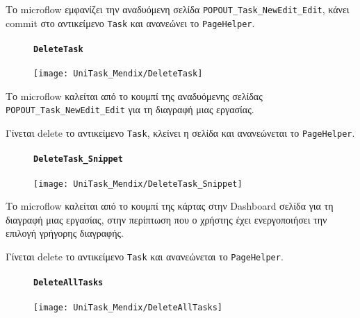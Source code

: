                 Το microflow εμφανίζει την αναδυόμενη σελίδα \texttt{POPOUT\_Task\_NewEdit\_Edit}, κάνει commit στο αντικείμενο \texttt{Task} και ανανεώνει το \texttt{PageHelper}.

                \begin{figure}[H] \noindent
                    \paragraph{\texttt{DeleteTask}}
                    \begin{center}
                        \texttt{[image: UniTask\_Mendix/DeleteTask]}
                    \end{center}
                \end{figure}

                Το microflow καλείται από το κουμπί της αναδυόμενης σελίδας \texttt{POPOUT\_Task\_NewEdit\_Edit} για τη διαγραφή μιας εργασίας.

                Γίνεται delete το αντικείμενο \texttt{Task}, κλείνει η σελίδα και ανανεώνεται το \texttt{PageHelper}.

                \begin{figure}[H] \noindent
                    \paragraph{\texttt{DeleteTask\_Snippet}}
                    \begin{center}
                        \texttt{[image: UniTask\_Mendix/DeleteTask\_Snippet]}
                    \end{center}
                \end{figure}

                Το microflow καλείται από το κουμπί της κάρτας στην Dashboard σελίδα για τη διαγραφή μιας εργασίας, στην περίπτωση που ο χρήστης έχει ενεργοποιήσει την επιλογή γρήγορης διαγραφής.

                Γίνεται delete το αντικείμενο \texttt{Task} και ανανεώνεται το \texttt{PageHelper}.

                \begin{figure}[H] \noindent
                    \paragraph{\texttt{DeleteAllTasks}}
                    \begin{center}
                        \texttt{[image: UniTask\_Mendix/DeleteAllTasks]}
                    \end{center}
                \end{figure}

